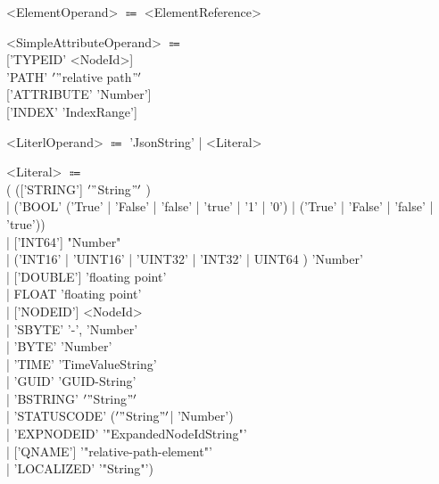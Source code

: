 \documentclass[10pt]{scrreprt}
\begin{document}
\begin{tabbing}
<ElementOperand> $\Coloneqq$  <ElementReference>
\end{tabbing}
\begin{tabbing}
<SimpleAttributeOperand> $\Coloneqq$ \\ \hspace{10mm} ['TYPEID' <NodeId>] \\ \hspace{10mm} 'PATH' \('"\)relative path\("'\)\\ \hspace{10mm} ['ATTRIBUTE' 'Number'] \\ \hspace{10mm} ['INDEX' 'IndexRange']
\end{tabbing}
\begin{tabbing}
<LiterlOperand> $\Coloneqq$ 'JsonString' | <Literal>
\end{tabbing}
\begin{tabbing}
<Literal> $\Coloneqq$ \\ \hspace{10mm} (  (['STRING'] \('"\)String\("'\) ) \\
\hspace{10mm}| ('BOOL' ('True' | 'False' | 'false' | 'true' | '1' | '0') | ('True' | 'False' | 'false' | 'true')) \\ \hspace{10mm}|
['INT64'] "Number" \\ \hspace{10mm}| ('INT16' | 'UINT16' | 'UINT32' | 'INT32' | UINT64 ) 'Number' \\\hspace{10mm}| ['DOUBLE'] 'floating point' \\\hspace{10mm}| FLOAT 'floating point' \\\hspace{10mm}| ['NODEID'] <NodeId> \\\hspace{10mm}| 'SBYTE' {'-', 'Number'} \\\hspace{10mm}| 'BYTE' 'Number'
\\\hspace{10mm}| 'TIME' 'TimeValueString' \\\hspace{10mm}| 'GUID' 'GUID-String' \\\hspace{10mm}| 'BSTRING' \('"\)String\("'\) \\\hspace{10mm}| 'STATUSCODE' (\('"\)String\("'\)| 'Number') \\\hspace{10mm}| 'EXPNODEID' '"ExpandedNodeIdString"' \\\hspace{10mm}| ['QNAME'] '"relative-path-element"' \\\hspace{10mm}| 'LOCALIZED' '"String"')
\end{tabbing}
\end{document}
